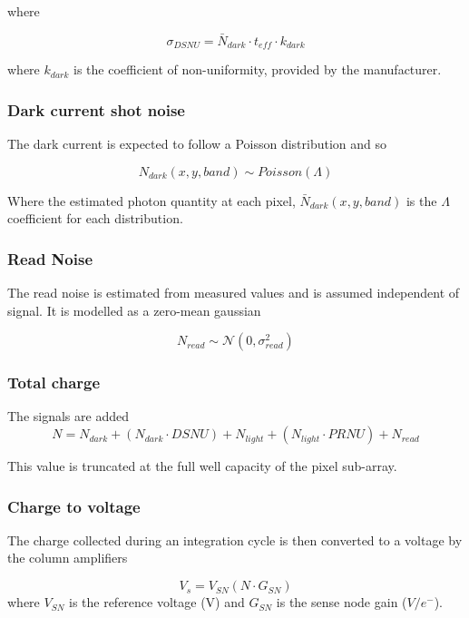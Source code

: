 \documentclass[10pt,a4paper,final,onecolumn]{article}
\begin{document}
where

\begin{equation}
\sigma_{DSNU} = \bar{N}_{dark} \cdot t_{eff} \cdot k_{dark}
\end{equation}

where $k_{dark}$ is the coefficient of non-uniformity, provided by the manufacturer.

\subsubsection{Dark current shot noise}
The dark current is expected to follow a Poisson distribution and so 

\begin{equation}
N_{dark}(x, y, band) \sim Poisson(\Lambda)
\end{equation}

Where the estimated photon quantity at each pixel, $\bar{N}_{dark}(x, y, band) $ is the $\Lambda$ coefficient for each distribution.

\subsubsection{Read Noise}
The read noise is estimated from measured values and is assumed independent of signal. It is modelled as a zero-mean gaussian

\begin{equation}
N_{read} \sim \mathcal{N}(0, \sigma_{read}^{2})
\end{equation}

\subsubsection{Total charge}
The signals are added
\begin{equation}
N = N_{dark} + (N_{dark} \cdot DSNU) + N_{light}
+ (N_{light} \cdot PRNU) + N_{read}
\end{equation}

This value is truncated at the full well capacity of the pixel sub-array.


\subsubsection{Charge to voltage}
The charge collected during an integration cycle is then converted to a voltage by the column amplifiers

\begin{equation}
V_s = V_{SN}(N \cdot G_{SN})
\end{equation}
where $V_{SN}$  is the reference voltage (V) and $G_{SN}$ is the sense node gain ($V/e^{-}$).
\end{document}
